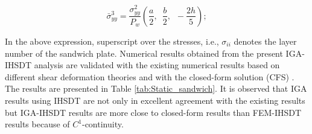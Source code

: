 \documentclass[3p,preprint,12pt]{elsarticle}
\begin{document}
\[
\bar{\sigma}_{yy}^{3}=\frac{\sigma_{yy}^{2}}{P_{w}}\left(\frac{a}{2},\,\,\,\frac{b}{2},\,\,\,-\frac{2h}{5}\right);
\]

In the above expression, superscript over the stresses, i.e., $\sigma_{ii}$ denotes the layer number of the sandwich plate. Numerical results obtained from the present IGA-IHSDT analysis are validated with the existing numerical results based on different shear deformation theories \cite{xiang2009analysis, ferreira2003analysis, mantari2012new, grover2014efficient, grover2013new} and with the closed-form solution (CFS) \cite{srinivas1973refined}. The results are presented in Table \ref{tab:Static_sandwich}. It is observed that IGA results using IHSDT are not only in excellent agreement with the existing results but IGA-IHSDT results are more close to closed-form results than FEM-IHSDT results because of $C^1$-continuity.
\end{document}
